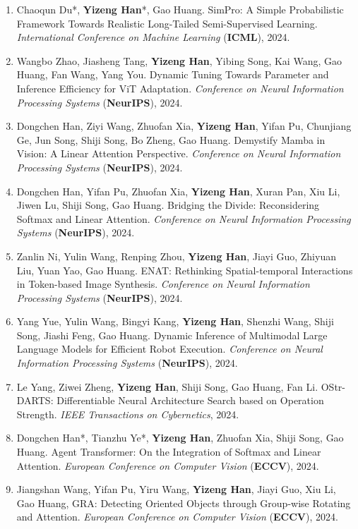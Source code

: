 \documentclass[10.5pt, UTF8]{ctexart}
\makeatletter
\newlength{\bibhang}
\newlength{\bibsep}
 {\@listi \global\bibsep\itemsep \global\advance\bibsep by\parsep}
\newenvironment{bibsection}%
        {\begin{enumerate}{%
       \setlength{\leftmargin}{-2em}%
       \setlength{\itemindent}{-2em}%
       \setlength{\itemsep}{\bibsep}%
        \setlength{\partopsep}{0pt}%
        \setlength{\topsep}{0pt}}}
        {\end{enumerate}\vspace{-.6\baselineskip}}
\makeatother
\begin{document}
\begin{sloppypar}
\begin{bibsection}
        \item Chaoqun Du*, \textbf{Yizeng Han}*, Gao Huang. SimPro: A Simple Probabilistic Framework Towards Realistic Long-Tailed Semi-Supervised Learning. \emph{International Conference on Machine Learning} (\textbf{ICML}), 2024.
        \item Wangbo Zhao, Jiasheng Tang, \textbf{Yizeng Han}, Yibing Song, Kai Wang, Gao Huang, Fan Wang, Yang You. Dynamic Tuning Towards Parameter and Inference Efficiency for ViT Adaptation. \emph{Conference on Neural Information Processing Systems} (\textbf{NeurIPS}), 2024.
        \item Dongchen Han, Ziyi Wang, Zhuofan Xia, \textbf{Yizeng Han}, Yifan Pu, Chunjiang Ge, Jun Song, Shiji Song, Bo Zheng, Gao Huang. Demystify Mamba in Vision: A Linear Attention Perspective. \emph{Conference on Neural Information Processing Systems} (\textbf{NeurIPS}), 2024.
        \item Dongchen Han, Yifan Pu, Zhuofan Xia, \textbf{Yizeng Han}, Xuran Pan, Xiu Li, Jiwen Lu, Shiji Song, Gao Huang. Bridging the Divide: Reconsidering Softmax and Linear Attention. \emph{Conference on Neural Information Processing Systems} (\textbf{NeurIPS}), 2024.
        \item Zanlin Ni, Yulin Wang, Renping Zhou, \textbf{Yizeng Han}, Jiayi Guo, Zhiyuan Liu, Yuan Yao, Gao Huang. ENAT: Rethinking Spatial-temporal Interactions in Token-based Image Synthesis. \emph{Conference on Neural Information Processing Systems} (\textbf{NeurIPS}), 2024.
        \item Yang Yue, Yulin Wang, Bingyi Kang, \textbf{Yizeng Han}, Shenzhi Wang, Shiji Song, Jiashi Feng, Gao Huang. Dynamic Inference of Multimodal Large Language Models for Efficient Robot Execution.  \emph{Conference on Neural Information Processing Systems} (\textbf{NeurIPS}), 2024.
        \item Le Yang, Ziwei Zheng, \textbf{Yizeng Han}, Shiji Song, Gao Huang, Fan Li. OStr-DARTS: Differentiable Neural Architecture Search based on Operation Strength. \emph{IEEE Transactions on Cybernetics}, 2024.
        \item Dongchen Han*, Tianzhu Ye*, \textbf{Yizeng Han}, Zhuofan Xia, Shiji Song, Gao Huang. Agent Transformer: On the Integration of Softmax and Linear Attention. \emph{European Conference on Computer Vision} (\textbf{ECCV}), 2024.
        \item Jiangshan Wang, Yifan Pu, Yiru Wang, \textbf{Yizeng Han}, Jiayi Guo, Xiu Li, Gao Huang, GRA: Detecting Oriented Objects through Group-wise Rotating and Attention. \emph{European Conference on Computer Vision} (\textbf{ECCV}), 2024.

\end{bibsection}
\end{sloppypar}
\end{document}
